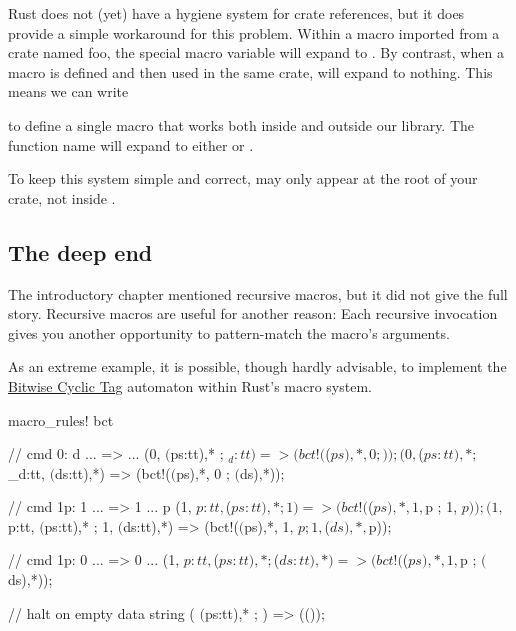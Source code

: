 \blank

Rust does not (yet) have a hygiene system for crate references, but it does provide a simple workaround for this problem. Within a 
macro imported from a crate named foo, the special macro variable  will expand to . By contrast, when a macro 
is defined and then used in the same crate,  will expand to nothing. This means we can write


to define a single macro that works both inside and outside our library. The function name will expand to either 
or .

\blank

To keep this system simple and correct,  may only appear at the root of your crate, not 
inside .

\subsection*{The deep end}

The introductory chapter mentioned recursive macros, but it did not give the full story. Recursive macros are useful for another 
reason: Each recursive invocation gives you another opportunity to pattern-match the macro's arguments.

\blank

As an extreme example, it is possible, though hardly advisable, to implement the 
\href{https://esolangs.org/wiki/Bitwise_Cyclic_Tag}{Bitwise Cyclic Tag} automaton within Rust's macro system.

\begin{rustc}
macro_rules! bct {
    // cmd 0:  d ... => ...
    (0, $($ps:tt),* ; $_d:tt)
        => (bct!($($ps),*, 0 ; ));
    (0, $($ps:tt),* ; $_d:tt, $($ds:tt),*)
        => (bct!($($ps),*, 0 ; $($ds),*));

    // cmd 1p:  1 ... => 1 ... p
    (1, $p:tt, $($ps:tt),* ; 1)
        => (bct!($($ps),*, 1, $p ; 1, $p));
    (1, $p:tt, $($ps:tt),* ; 1, $($ds:tt),*)
        => (bct!($($ps),*, 1, $p ; 1, $($ds),*, $p));

    // cmd 1p:  0 ... => 0 ...
    (1, $p:tt, $($ps:tt),* ; $($ds:tt),*)
        => (bct!($($ps),*, 1, $p ; $($ds),*));

    // halt on empty data string
    ( $($ps:tt),* ; )
        => (());
}
\end{rustc}

